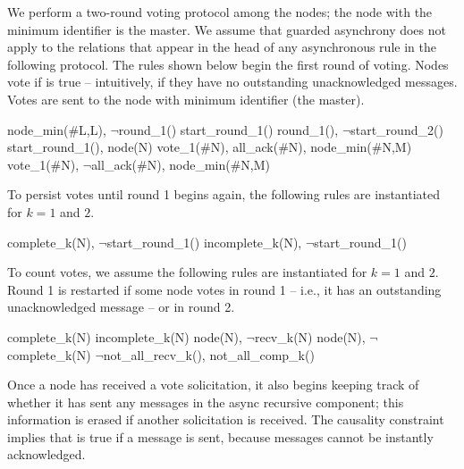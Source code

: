 We perform a two-round voting protocol among the nodes; the node with the minimum identifier is the master.  We assume that guarded asynchrony does not apply to the relations that appear in the head of any asynchronous rule in the following protocol.  The rules shown below begin the first round of voting.  Nodes vote  if  is true -- intuitively, if they have no outstanding unacknowledged messages.  Votes are sent to the node with minimum identifier (the master).

\begin{Drules}
      {node_min(#L,L), $\lnot$round_1()}
      {start_round_1()}
      {round_1(), $\lnot$start_round_2()}
      {start_round_1(), node(N)}
      {vote_1(#N), all_ack(#N), node_min(#N,M)}
      {vote_1(#N), $\lnot$all_ack(#N), node_min(#N,M)}
\end{Drules}

To persist votes until round 1 begins again, the following rules are instantiated for $k=1$ and $2$.

\begin{Drules}
      {complete_k(N), $\lnot$start_round_1()}
      {incomplete_k(N), $\lnot$start_round_1()}
\end{Drules}

To count votes, we assume the following rules are instantiated for $k=1$ and $2$.  Round 1 is restarted if some node votes  in round 1 -- i.e., it has an outstanding unacknowledged message -- or  in round 2.

\begin{Drules}
      {complete_k(N)}
      {incomplete_k(N)}
      {node(N), $\lnot$recv_k(N)}
      {node(N), $\lnot$complete_k(N)}
      {$\lnot$not_all_recv_k(), not_all_comp_k()}
\end{Drules}

Once a node has received a  vote solicitation, it also begins keeping track of whether it has sent any messages in the async recursive component; this information is erased if another  solicitation is received.  The causality constraint implies that  is true if a message is sent, because messages cannot be instantly acknowledged.

